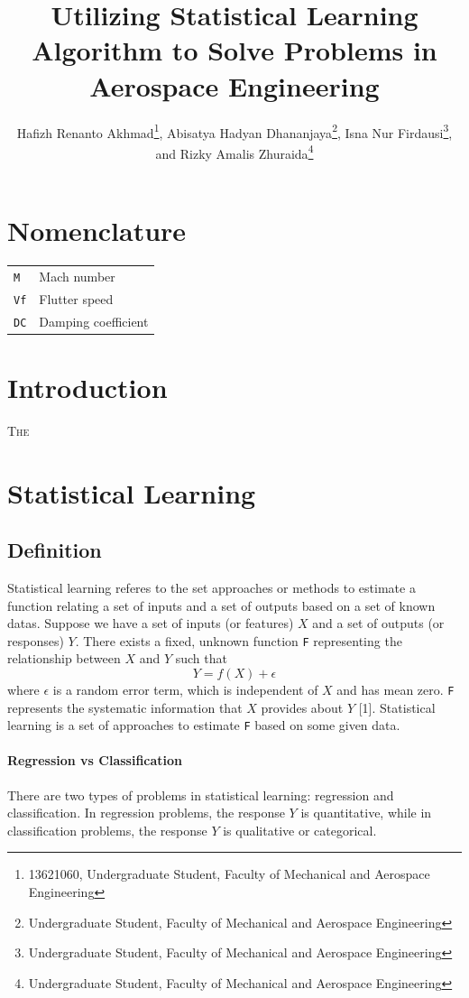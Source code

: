 \documentclass[conf]{new-aiaa}
\title{Utilizing Statistical Learning Algorithm to Solve Problems in Aerospace Engineering}
\author{Hafizh Renanto Akhmad\footnote{13621060, Undergraduate Student, Faculty of Mechanical and Aerospace Engineering}, Abisatya Hadyan Dhananjaya\footnote{Undergraduate Student, Faculty of Mechanical and Aerospace Engineering}, Isna Nur Firdausi\footnote{Undergraduate Student, Faculty of Mechanical and Aerospace Engineering}, and Rizky Amalis Zhuraida\footnote{Undergraduate Student, Faculty of Mechanical and Aerospace Engineering}}
\affil{Institut Teknologi Bandung, Bandung, Jawa Barat, 40132}
\begin{document}
\maketitle

\begin{abstract}
\lipsum[1]
\end{abstract}

\section{Nomenclature}

{\renewcommand\arraystretch{1.0}
\noindent\begin{longtable*}{@{}l @{\quad=\quad} l@{}}
    \texttt{M} & Mach number\\
    \texttt{Vf} & Flutter speed\\
    \texttt{DC} & Damping coefficient
\end{longtable*}}

\section{Introduction}
\lettrine{T}{he} 

\section{Statistical Learning}
\subsection{Definition}
Statistical learning referes to the set approaches or methods to estimate a function relating a set of inputs and a set of outputs based on a set of known datas. Suppose we have a set of inputs (or features) $X$ and a set of outputs (or responses) $Y$. There exists a fixed, unknown function \texttt{F} representing the relationship between $X$ and $Y$ such that 
\begin{equation} \label{eq:statslearndef}
    Y = f(X) + \epsilon
\end{equation}
where $\epsilon$ is a random error term, which is independent of $X$ and has mean zero. \texttt{F} represents the systematic information that $X$ provides about $Y$ [1]. Statistical learning is a set of approaches to estimate \texttt{F} based on some given data.

\paragraph{Regression vs Classification}
There are two types of problems in statistical learning: regression and classification. In regression problems, the response $Y$ is quantitative, while in classification problems, the response $Y$ is qualitative or categorical.
\end{document}
